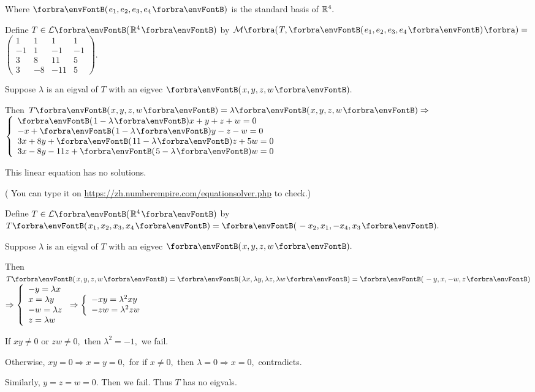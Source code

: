 \documentclass[a4paper, 11pt, UTF8]{article}
\begin{document}
\begin{large}
Where $\Par{e_1,e_2,e_3,e_4}$ is the standard basis of $\Rbb^4.$\par\quad
Define $T\in\Lm{\Rbb^4}$ by $\Mt[\BigPar]{T,\Par{e_1,e_2,e_3,e_4}}=${\footnotesize$\begin{pmatrix}
 1 & 1 & 1 & 1\\
 -1 & 1 & -1 & -1\\
 3 & 8 & 11 & 5\\
 3 & -8 & -11 & 5
\end{pmatrix}.$}\par\quad
Suppose $\lambda$ is an eigval of $T$ with an eigvec $\Par{x,y,z,w}.$\par\quad
Then $T\Par{x,y,z,w}=\lambda\Par{x,y,z,w}\Rightarrow${\footnotesize$\MathLeftBrace{l}{
\Par{1-\lambda}x+y+z+w=0\\
-x+\Par{1-\lambda}y-z-w=0\\
3x+8y+\Par{11-\lambda}z+5w=0\\
3x-8y-11 z+\Par{5-\lambda}w=0}$}\par\quad
This linear equation has no solutions.\par\quad
( You can type it on \url{https://zh.numberempire.com/equationsolver.php} to check.)\large\par\vspace{6pt}\quad
\Or Define $T\in\Lm{\Rbb^4}$ by $T\Par{x_1,x_2,x_3,x_4}=\Par{-x_2,x_1,-x_4,x_3}.$\par\quad
Suppose $\lambda$ is an eigval of $T$ with an eigvec $\Par{x,y,z,w}.$\par\quad
Then $T\Par{x,y,z,w}=\Par{\lambda x,\lambda y,\lambda z,\lambda w}=\Par{-y,x,-w,z}${\footnotesize$\Rightarrow\MathLeftBrace{l}{
-y=\lambda x\\
x=\lambda y\\
-w=\lambda z\\
z=\lambda w}\Rightarrow\MathLeftBrace{l}{
-xy=\lambda^2 xy\\
-zw=\lambda^2 zw}$}\par\quad
If $xy\neq 0$ or $zw\neq 0,$ then $\lambda^2=-1,$ we fail.\par\quad
Otherwise, $xy=0\Rightarrow x=y=0,$ for if $x\neq 0,$ then $\lambda=0\Rightarrow x=0,$ contradicts.\par\quad
Similarly, $y=z=w=0.$ Then we fail. Thus $T$ has no eigvals.\PfEnd
\SepLine


\end{large}
\end{document}
